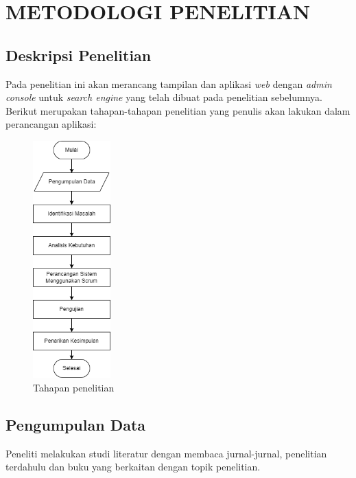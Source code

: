 
\chapter{METODOLOGI PENELITIAN}


\section {Deskripsi Penelitian}

Pada penelitian ini akan merancang tampilan dan aplikasi \textit{web} dengan \textit{admin console} untuk \textit{search engine} yang telah dibuat pada penelitian sebelumnya. Berikut merupakan tahapan-tahapan penelitian yang penulis akan lakukan dalam perancangan aplikasi:


\begin{figure}[H]
	\centering
	\includegraphics[keepaspectratio, width=3cm]{gambar/flowchart.png}
	\caption{Tahapan penelitian}
	\label{gambar:flowchart.png}
\end{figure}


\section {Pengumpulan Data}

Peneliti melakukan studi literatur dengan membaca jurnal-jurnal, penelitian terdahulu dan buku yang berkaitan dengan topik penelitian.

